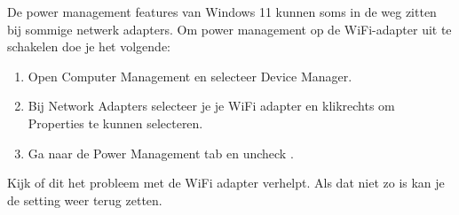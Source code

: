De power management features van Windows 11 kunnen soms in de weg zitten bij sommige netwerk adapters. Om power management op de WiFi-adapter uit te schakelen doe je het volgende:
\begin{enumerate}
\item Open Computer Management en selecteer Device Manager.
\item Bij Network Adapters selecteer je je WiFi adapter en klikrechts om Properties te kunnen selecteren.
\item Ga naar de Power Management tab en uncheck .
\end{enumerate}

Kijk of dit het probleem met de WiFi adapter verhelpt. Als dat niet zo is kan je de setting weer terug zetten.

